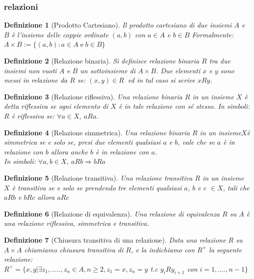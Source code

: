 \documentclass[a4paper]{article}
\newtheorem*{definition}{Definizione}
\begin{document}
\subsubsection{relazioni}
\begin{definition}[Prodotto Cartesiano]Il prodotto cartesiano di due insiemi $A$ e $B$ è l'insieme delle coppie ordinate $(a,b)$ con $a \in A$ e $b \in B$ Formalmente:\\
$A\times B:=\{(a,b):a\in A\;{\mathrm  {e}}\;b\in B\}$ 
\end{definition}
\begin{definition}[Relazione binaria]
Si definisce relazione binaria $R$ tra due insiemi non vuoti $A$ e $B$ un sottoinsieme di $ A \times B$. Due elementi $x$ e $y$ sono messi in relazione da $R$ se: 
$(x,y)\in R\ $ ed in tal caso si scrive $xRy$.
\end{definition}
\begin{definition}[Relazione riflessiva]
Una relazione binaria $R$ in un insieme $X$ è detta riflessiva se ogni elemento di $X$ è in tale relazione con sé stesso.
In simboli: $R$ è riflessiva se: $ \forall a\in X,\ aRa.$
\end{definition}
\begin{definition}[Relazione simmetrica]Una relazione binaria $R$ in un insieme$ X $è simmetrica se e solo se, presi due elementi qualsiasi $a$ e $b$, vale che se $a$ è in relazione con $b$ allora anche $b$ è in relazione con $a$.\\
In simboli: $\forall a,b\in X,\ aRb\Rightarrow bRa$
\end{definition}
\begin{definition}[Relazione transitiva]Una relazione transitiva $R$ in un insieme $X$ è transitiva se e solo se prendendo tre elementi qualsiasi $a$, $b$ e $c$ $ \in X$, tali che $aRb$ e $bRc$ allora $aRc$
\end{definition}
\begin{definition}[Relazione di equivalenza]Una relazione di equivalenza $R$ su $A$ è una relazione riflessiva, simmetrica e transitiva.
\end{definition}
\begin{definition}[Chiusura transitiva di una relazione]Data una relazione $R$ su $A\times A$ chiamiamo chiusura transitiva di $R$, e la indichiamo con $R^{+}$ la seguente relazione:\\
	$ R^{+} = \{ x, y | \exists z_1,.....,z_n \in A, n \geq 2, z_1 = x, z_n = y$ t.c $ y_iRy_{i+1}$ con $ i=1,....,n-1 \} $ 
\end{definition}
\end{document}
